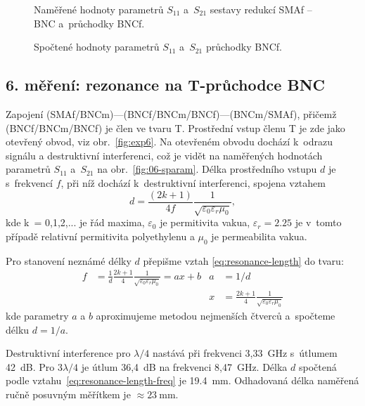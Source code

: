 \documentclass{protokol}
\newcommand\sparam{S}
\newcommand\female{f}
\newcommand\permitfree{\varepsilon_0}
\newcommand\permitrel{\varepsilon_r}
\newcommand\permeabfree{\mu_0}
\newcommand\connector[2]{#1 -- #2}
\begin{document}
\begin{figure}[htp]
	\centering
	
	
	\caption{Naměřené hodnoty parametrů $\sparam_{11}$ a~$\sparam_{21}$
		sestavy redukcí \connector{SMA\female}{BNC} a~průchodky BNC\female.}
	\label{fig:05-sparam}
\end{figure}

\begin{figure}[htp]
	\centering
	
	
	\caption{Spočtené hodnoty parametrů $\sparam_{11}$ a~$\sparam_{21}$
		průchodky BNC\female.}
	\label{fig:05-result-sparam}
\end{figure}

\subsection{6. měření: rezonance na T-průchodce BNC}
\newcommand\freelen{d}
Zapojení (SMAf/BNCm)---(BNCf/BNCm/BNCf)---(BNCm/SMAf),
přičemž (BNCf/BNCm/BNCf) je člen ve tvaru T.
Prostřední vstup členu T je zde jako otevřený obvod, viz obr.~\ref{fig:exp6}.
Na otevřeném obvodu dochází k~odrazu signálu a destruktivní interferenci, což 
je vidět na naměřených hodnotách parametrů $\sparam_{11}$ a~$\sparam_{21}$ na 
obr.~\ref{fig:06-sparam}.
Délka prostředního vstupu $d$ je s~frekvencí $f$,
při níž dochází k~destruktivní interferenci, spojena vztahem
\begin{equation}
	d = \frac{(2k+1)}{4f} \frac{1}{\sqrt{\varepsilon_0 \varepsilon_r \mu_0}},
	\label{eq:resonance-length}
\end{equation}
kde k~= 0,1,2,... je řád maxima, $\varepsilon_0$ je permitivita vakua,
$\varepsilon_r = \num{2.25}$ je v~tomto případě relativní permitivita polyethylenu
a $\mu_0$ je permeabilita vakua.

Pro stanovení neznámé délky $\freelen$ přepišme vztah
\eqref{eq:resonance-length} do tvaru:
\begin{align}
	\label{eq:resonance-length-freq}
	f &= \frac{1}{\freelen} \frac{2k+1}{4}
		\frac{1}{\sqrt{\permitfree\permitrel\permeabfree}}
		= ax + b &
	a &= 1/\freelen \\
	& &
	x &= \frac{2k+1}{4}
		\frac{1}{\sqrt{\permitfree\permitrel\permeabfree}}
\end{align}
kde parametry $a$ a $b$ aproximujeme metodou nejmenších čtverců
a~spočteme délku $\freelen = 1/a$.

Destruktivní interference pro $\lambda/4$ nastává při frekvenci 3,33~GHz
s~útlumem 42~dB. Pro $3\lambda/4$ je útlum 36,4~dB na
frekvenci 8,47~GHz.
Délka $d$ spočtená podle vztahu~\eqref{eq:resonance-length-freq} je
\SI{19.4}{\milli\metre}. Odhadovaná délka naměřená ručně posuvným měřítkem je 
$\approx\SI{23}{\milli\metre}$.
\end{document}
